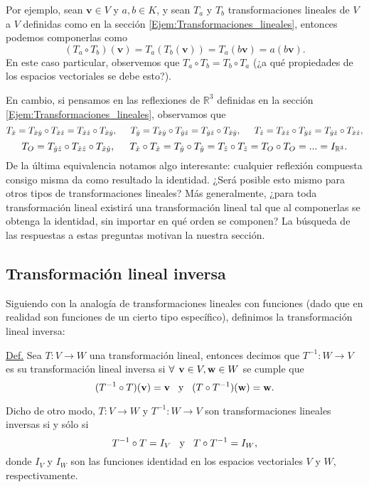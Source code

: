 \documentclass[12pt]{article}
\begin{document}
Por ejemplo, sean $\mathbf{v}\in V$ y $a,b\in K$, y sean $T_a$ y $T_b$ transformaciones lineales de $V$ a $V$ definidas como en la sección \ref{Ejem:Transformaciones_lineales}, entonces podemos componerlas como \[
    (T_a\circ T_b)(\mathbf{v})=T_a(T_b(\mathbf{v}))=T_a(b\mathbf{v})=a(b\mathbf{v})
.\] \noindent En este caso particular, observemos que $T_a\circ T_b = T_b\circ T_a$ (¿a qué propiedades de los espacios vectoriales se debe esto?). 

En cambio, si pensamos en las reflexiones de $\mathbb{R}^3$ definidas en la sección \ref{Ejem:Transformaciones_lineales}, observamos que \[
    T_{\hat{x}}=T_{\hat{x}\hat{y}}\circ T_{\hat{x}\hat{z}}=T_{\hat{x}\hat{z}}\circ T_{\hat{x}\hat{y}}, \hspace{5mm} T_{\hat{y}}=T_{\hat{x}\hat{y}}\circ T_{\hat{y}\hat{z}}=T_{\hat{y}\hat{z}}\circ T_{\hat{x}\hat{y}},\hspace{5mm} T_{\hat{z}}=T_{\hat{x}\hat{z}}\circ T_{\hat{y}\hat{z}}=T_{\hat{y}\hat{z}}\circ T_{\hat{x}\hat{z}},
\] \[
T_O=T_{\hat{y}\hat{z}}\circ T_{\hat{x}\hat{z}} \circ T_{\hat{x}\hat{y}}, \hspace{5mm} T_{\hat{x}}\circ T_{\hat{x}} = T_{\hat{y}}\circ T_{\hat{y}} = T_{\hat{z}}\circ T_{\hat{z}} = T_O \circ T_O = ... = I_{\mathbb{R}^3}
.\] De la última equivalencia notamos algo interesante: cualquier reflexión compuesta consigo misma da como resultado la identidad. ¿Será posible esto mismo para otros tipos de transformaciones lineales? Más generalmente, ¿para toda transformación lineal existirá una transformación lineal tal que al componerlas se obtenga la identidad, sin importar en qué orden se componen? La búsqueda de las respuestas a estas preguntas motivan la nuestra sección.

\subsection{Transformación lineal inversa}

Siguiendo con la analogía de transformaciones lineales con funciones (dado que en realidad son funciones de un cierto tipo específico), definimos la transformación lineal inversa:

\begin{tcolorbox}
\underline{Def.} Sea $T:V\to W$ una transformación lineal, entonces decimos que $T^{-1}:W\to V$ es su transformación lineal inversa si $\forall\hspace{1.5mm} \mathbf{v}\in V, \mathbf{w}\in W$ se cumple que \[(T^{-1}\circ T)(\mathbf{v})=\mathbf{v}\hspace{3mm} \text{y} \hspace{3mm} (T\circ T^{-1})(\mathbf{w})=\mathbf{w}.\]

Dicho de otro modo, $T:V\to W$ y $T^{-1}:W\to V$ son transformaciones lineales inversas si y sólo si \[T^{-1}\circ T=I_V \hspace{3mm} \text{y} \hspace{3mm} T\circ T^{-1}=I_W,\] \noindent donde $I_V$ y $I_W$ son las funciones identidad en los espacios vectoriales $V$ y $W$, respectivamente.

\end{tcolorbox}{}
\end{document}
